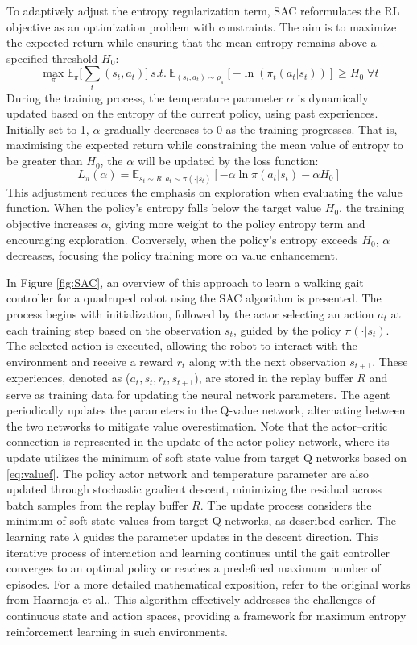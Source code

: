 To adaptively adjust the entropy regularization term, SAC reformulates the RL objective as an optimization problem with constraints. The aim is to maximize the expected return while ensuring that the mean entropy remains above a specified threshold $H_0$: $$\max_\pi\mathbb{E}_\pi \bigg[\sum_t (s_t,a_t)\bigg]\:s.t.\:\mathbb{E}_{(s_t,a_t)\sim\rho_\pi}[-\ln (\pi_t(a_t|s_t))] \geq H_0\;\forall t$$ During the training process, the temperature parameter $\alpha$ is dynamically updated based on the entropy of the current policy, using past experiences. Initially set to 1, $\alpha$ gradually decreases to 0 as the training progresses. That is, maximising the expected return while constraining the mean value of entropy to be greater than $H_0$, the $\alpha$ will be updated by the loss function: $$L_\pi(\alpha) = \mathbb{E}_{s_t\sim R,a_t\sim\pi(\cdot|s_t)} [-\alpha\ln\pi(a_t|s_t)-\alpha H_0]$$ This adjustment reduces the emphasis on exploration when evaluating the value function. When the policy's entropy falls below the target value $H_0$, the training objective increases $\alpha$, giving more weight to the policy entropy term and encouraging exploration. Conversely, when the policy's entropy exceeds $H_0$, $\alpha$ decreases, focusing the policy training more on value enhancement. 

In Figure \ref{fig:SAC}, an overview of this approach to learn a walking gait controller for a quadruped robot using the SAC algorithm is presented. The process begins with initialization, followed by the actor selecting an action $a_t$ at each training step based on the observation $s_t$, guided by the policy $\pi(\cdot|s_t)$. The selected action is executed, allowing the robot to interact with the environment and receive a reward $r_t$ along with the next observation $s_{t+1}$. These experiences, denoted as ($a_t, s_t, r_t, s_{t+1}$), are stored in the replay buffer $R$ and serve as training data for updating the neural network parameters. The agent periodically updates the parameters in the Q-value network, alternating between the two networks to mitigate value overestimation. Note that the actor–critic connection is represented in the update of the actor policy network, where its update utilizes the minimum of soft state value from target Q networks based on \ref{eq:valuef}. The policy actor network and temperature parameter are also updated through stochastic gradient descent, minimizing the residual across batch samples from the replay buffer $R$. The update process considers the minimum of soft state values from target Q networks, as described earlier. The learning rate $\lambda$ guides the parameter updates in the descent direction. This iterative process of interaction and learning continues until the gait controller converges to an optimal policy or reaches a predefined maximum number of episodes. For a more detailed mathematical exposition, refer to the original works from Haarnoja et al.\cite{haarnojaSoftActorCriticAlgorithms2019, haarnojaSoftActorCriticOffPolicy2018}. This algorithm effectively addresses the challenges of continuous state and action spaces, providing a framework for maximum entropy reinforcement learning in such environments.

